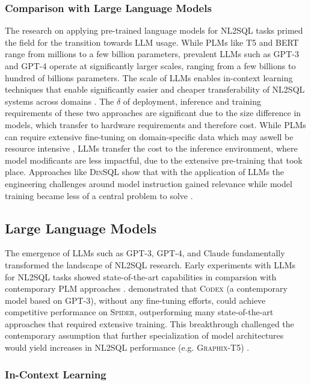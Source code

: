 \documentclass{article}
\begin{document}
\subsubsection{Comparison with Large Language Models}

The research on applying pre-trained language models for NL2SQL tasks primed the field for the transition towards LLM usage. While
PLMs like T5 and BERT range from millions to a few billion parameters, prevalent LLMs such as GPT-3 and GPT-4 operate at
significantly larger scales, ranging from a few billions to hundred of billions parameters. The scale of LLMs enables in-context
learning techniques that enable significantly easier and cheaper transferability of NL2SQL systems across domains \citep{DAIL-SQL}.
The $\delta$ of deployment, inference and training requirements of these two approaches are significant due to the size difference
in models, which transfer to hardware requirements and therefore cost. While PLMs can require extensive fine-tuning on domain-specific
data which may aswell be resource intensive \citep{GRAPHIX, RESDSQL, GRAPPA, STRUG}, LLMs transfer the cost to the inference environment,
where model modificants are less impactful, due to the extensive pre-training that took place. Approaches like \textsc{DinSQL} show
that with the application of LLMs the engineering challenges around model instruction gained relevance while model training became
less of a central problem to solve \citep{DINSQL}.

\subsection{Large Language Models}

The emergence of LLMs such as GPT-3, GPT-4, and Claude fundamentally transformed the landscape of NL2SQL research. Early experiments 
with LLMs for NL2SQL tasks showed state-of-the-art capabilities in comparsion with contemporary PLM approaches \citep{DAIL-SQL}.
\cite{T2SQL-LLM-Bench-3} demonstrated that \textsc{Codex} (a contemporary model based on GPT-3), without any fine-tuning efforts,
could achieve competitive performance on \textsc{Spider}, outperforming many state-of-the-art approaches that required extensive
training. This breakthrough challenged the contemporary assumption that further specialization of model architectures would yield
increases in NL2SQL performance (e.g. \textsc{Graphix-T5}) \citep{GRAPHIX}.

\subsubsection{In-Context Learning}
\end{document}
